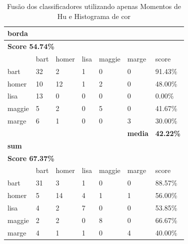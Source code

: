 \documentclass[journal]{IEEEtran}
\begin{document}
\begin{table}[!htb]
\centering
\caption{Fusão dos classificadores utilizando apenas Momentos de Hu e Histograma de cor}
\label{tbl:huandcolor}
\small
\singlespacing
\begin{tabular}{l|l|l|l|l|l|l}
\hline
\multicolumn{7}{l}{\textbf{borda}}                                                          \\ \hline
\multicolumn{7}{l}{\textbf{Score 54.74\%}}                                                  \\ \hline
          & bart      & homer     & lisa      & maggie    & marge          & score            \\ \hline
bart      & 32        & 2         & 1         & 0         & 0              & 91.43\%          \\ \hline
homer     & 10        & 12        & 1         & 2         & 0              & 48.00\%          \\ \hline
lisa      & 13        & 0         & 0         & 0         & 0              & 0.00\%           \\ \hline
maggie    & 5         & 2         & 0         & 5         & 0              & 41.67\%          \\ \hline
marge     & 6         & 1         & 0         & 0         & 3              & 30.00\%          \\ \hline
\textbf{} & \textbf{} & \textbf{} & \textbf{} & \textbf{} & \textbf{media} & \textbf{42.22\%} \\ \hline
\multicolumn{7}{l}{\textbf{sum}}                                                            \\ \hline
\multicolumn{7}{l}{\textbf{Score 67.37\%}}                                                  \\ \hline
          & bart      & homer     & lisa      & maggie    & marge          & score            \\ \hline
bart      & 31        & 3         & 1         & 0         & 0              & 88.57\%          \\ \hline
homer     & 5         & 14        & 4         & 1         & 1              & 56.00\%          \\ \hline
lisa      & 4         & 2         & 7         & 0         & 0              & 53.85\%          \\ \hline
maggie    & 2         & 2         & 0         & 8         & 0              & 66.67\%          \\ \hline
marge     & 4         & 1         & 1         & 0         & 4              & 40.00\%          \\ \hline

\end{tabular}
\end{table}
\end{document}

